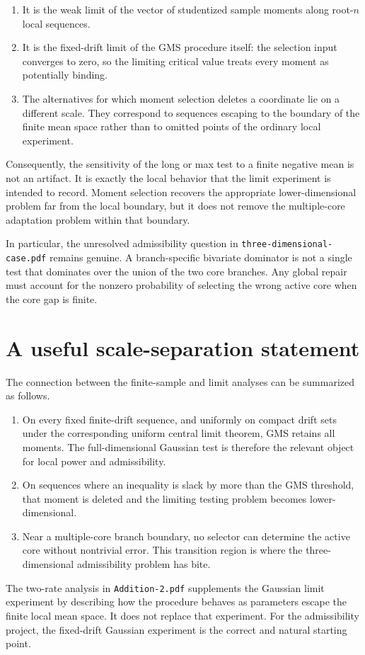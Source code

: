 \documentclass[12pt]{article}
\theoremstyle{remark}
\begin{document}
\begin{enumerate}
\item It is the weak limit of the vector of studentized sample moments along
root-$n$ local sequences.

\item It is the fixed-drift limit of the GMS procedure itself: the selection
input converges to zero, so the limiting critical value treats every moment
as potentially binding.

\item The alternatives for which moment selection deletes a coordinate lie
on a different scale.  They correspond to sequences escaping to the boundary
of the finite mean space rather than to omitted points of the ordinary local
experiment.
\end{enumerate}

Consequently, the sensitivity of the long or max test to a finite negative
mean is not an artifact.  It is exactly the local behavior that the limit
experiment is intended to record.  Moment selection recovers the appropriate
lower-dimensional problem far from the local boundary, but it does not remove
the multiple-core adaptation problem within that boundary.

In particular, the unresolved admissibility question in
\texttt{three-dimensional-case.pdf} remains genuine.  A branch-specific
bivariate dominator is not a single test that dominates over the union of the
two core branches.  Any global repair must account for the nonzero probability
of selecting the wrong active core when the core gap is finite.

\section{A useful scale-separation statement}

The connection between the finite-sample and limit analyses can be summarized
as follows.

\begin{enumerate}
\item On every fixed finite-drift sequence, and uniformly on compact drift
sets under the corresponding uniform central limit theorem, GMS retains all
moments.  The full-dimensional Gaussian test is therefore the relevant object
for local power and admissibility.

\item On sequences where an inequality is slack by more than the GMS
threshold, that moment is deleted and the limiting testing problem becomes
lower-dimensional.

\item Near a multiple-core branch boundary, no selector can determine the
active core without nontrivial error.  This transition region is where the
three-dimensional admissibility problem has bite.
\end{enumerate}

The two-rate analysis in \texttt{Addition-2.pdf} supplements the Gaussian
limit experiment by describing how the procedure behaves as parameters escape
the finite local mean space.  It does not replace that experiment.  For the
admissibility project, the fixed-drift Gaussian experiment is the correct and
natural starting point.
\end{document}
